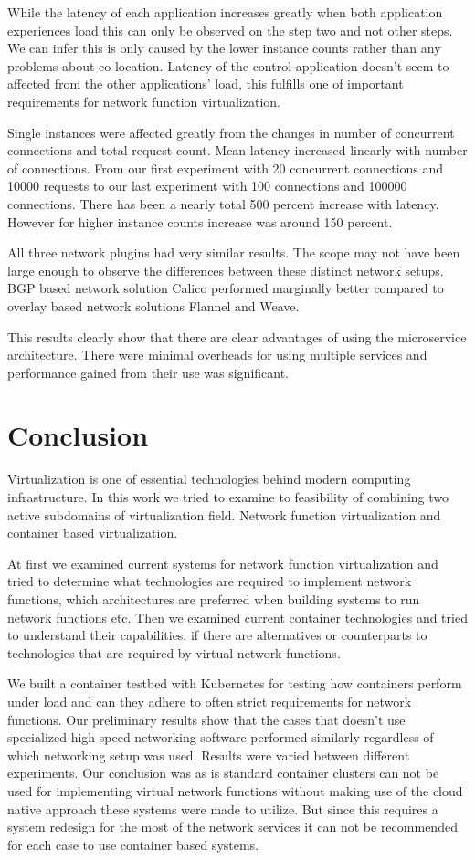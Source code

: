 \documentclass[12pt,oneandhalf,chaparabic,ceng,ms,eng,oneside,pntc]{gsufbe}
\begin{document}
While the latency of each application increases greatly when both application experiences load this can
only be observed on the step two and not other steps.  We can infer this is only caused by the lower
instance counts rather than any problems about co-location.  Latency of the control application doesn't
seem to affected from the other applications' load, this fulfills one of important requirements for
network function virtualization.

Single instances were affected greatly from the changes in number of concurrent connections and total
request count. Mean latency increased linearly with number of connections. From our first experiment
with 20 concurrent connections and 10000 requests to our  last experiment with 100 connections and 
100000 connections. There has been a nearly total 500 percent increase with latency. However for higher
instance counts increase was around 150 percent.

All three network plugins had very similar results. The scope may not have been large enough to observe
the differences between these distinct network setups. BGP based network solution Calico performed
marginally better compared to overlay based network solutions Flannel and Weave.

This results clearly show that there are clear advantages of using the microservice architecture. There
were minimal overheads for using multiple services and performance gained from their use was significant.

\chapter{Conclusion}
Virtualization is one of essential technologies behind modern computing infrastructure.  In this work we
tried to examine to feasibility of combining two active subdomains of virtualization field.  Network
function virtualization and container based virtualization.

At first we examined current systems for network function virtualization and tried to determine what
technologies are required to implement network functions, which architectures are preferred when
building systems to run network functions etc. Then we examined current container technologies and
tried to understand their capabilities, if there are alternatives or counterparts to technologies that
are required by virtual network functions.

We built a container testbed with Kubernetes for testing how containers perform under load and can they
adhere to often strict requirements for network functions.  Our preliminary results show that the cases
that doesn't use specialized high speed networking software performed similarly regardless of which
networking setup was used.  Results were varied between different experiments.  Our conclusion was as is
standard container clusters can not be used for implementing virtual network functions without making use
of the cloud native approach these systems were made to utilize. But since this requires a system redesign
for the most of the network services it can not be recommended for each case to use container based systems.
\end{document}
